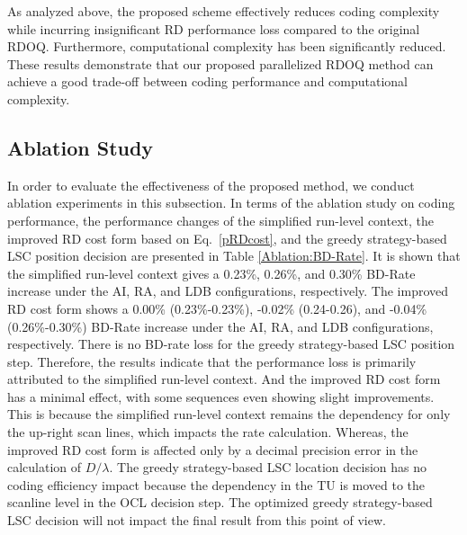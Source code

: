 \documentclass[lettersize,journal]{IEEEtran}
\begin{document}
As analyzed above, the proposed scheme effectively reduces coding complexity while incurring insignificant RD performance loss compared to the original RDOQ. Furthermore, computational complexity has been significantly reduced. These results demonstrate that our proposed parallelized RDOQ method can achieve a good trade-off between coding performance and computational complexity. 

\subsection{Ablation Study}
In order to evaluate the effectiveness of the proposed method, we conduct ablation experiments in this subsection. In terms of the ablation study on coding performance, the performance changes of the simplified run-level context, the improved RD cost form based on Eq.~\eqref{pRDcost}, and the greedy strategy-based LSC position decision are presented in Table \ref{Ablation:BD-Rate}. It is shown that the simplified run-level context gives a 0.23\%, 0.26\%, and 0.30\% BD-Rate increase under the AI, RA, and LDB configurations, respectively. The improved RD cost form shows a 0.00\% (0.23\%-0.23\%), -0.02\% (0.24-0.26), and -0.04\% (0.26\%-0.30\%) BD-Rate increase under the AI, RA, and LDB configurations, respectively. There is no BD-rate loss for the greedy strategy-based LSC position step. Therefore, the results indicate that the performance loss is primarily attributed to the simplified run-level context. And the improved RD cost form has a minimal effect, with some sequences even showing slight improvements. This is because the simplified run-level context remains the dependency for only the up-right scan lines, which impacts the rate calculation. Whereas, the improved RD cost form is affected only by a decimal precision error in the calculation of $D/\lambda$. The greedy strategy-based LSC location decision has no coding efficiency impact because the dependency in the TU is moved to the scanline level in the OCL decision step. The optimized greedy strategy-based LSC decision will not impact the final result from this point of view. 
\end{document}
